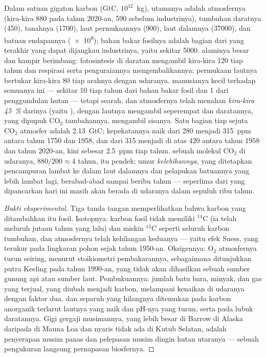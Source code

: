 \begin{proposition}\label{prop:b2:biogeochemical-cycles:carbon}
Dalam satuan gigaton karbon (\unit{GtC}, $10^{12}$~kg), 
utamanya adalah atmosfernya (kira-kira 880 pada tahun 2020-an, 590
sebelum industrinya), tumbuhan daratnya (450), tanahnya (1700), laut
permukaannya (900), laut dalamnya (\num{37000}), dan batuan endapannya
(\num{e8}); bahan bakar fosilnya adalah bagian dari yang terakhir yang
dapat dijangkau industrinya, yaitu sekitar \num{5000}.  alaminya
besar dan hampir berimbang: fotosintesis di daratan mengambil kira-kira
120 tiap tahun dan respirasi serta penguraiannya mengembalikannya;
permukaan lautnya bertukar kira-kira 80 tiap arahnya dengan udaranya.
 manusianya kecil terhadap semuanya ini --- sekitar 10 tiap tahun
dari bahan bakar fosil dan 1 dari penggundulan hutan --- tetapi searah,
dan atmosfernya telah menahan \emph{kira-kira \qty{45}{\%}} darinya
(yaitu \emph{}), dengan lautnya mengambil
seperempat dan daratannya, yang dipupuk $\mathrm{CO_2}$ tambahannya,
mengambil sisanya. Satu bagian tiap sejuta $\mathrm{CO_2}$ atmosfer adalah
\qty{2.13}{GtC}; kepekatannya naik dari 280 menjadi \num{315}~ppm
antara tahun 1750 dan 1958, dan dari 315 menjadi di atas \num{420}
antara tahun 1958 dan tahun 2020-an, kini sebesar \qty{2.5}{ppm} tiap
tahun.  sebuah molekul $\mathrm{CO_2}$ di udaranya, $880/200 \approx 4$ tahun, itu pendek; umur \emph{kelebihannya}, yang ditetapkan
pencampuran lambat ke dalam laut dalamnya dan pelapukan batuannya yang
lebih lambat lagi, berabad-abad sampai beribu tahun --- seperlima dari
yang dipancarkan hari ini masih akan berada di udaranya dalam sepuluh
ribu tahun.
\end{proposition}
\begin{proof}[Bukti eksperimental]
Tiga tanda tangan memperlihatkan bahwa karbon yang ditambahkan itu
fosil. Isotopnya: karbon fosil tidak memiliki $\mathrm{{}^{14}C}$ (ia
telah meluruh jutaan tahun yang lalu) dan miskin $\mathrm{{}^{13}C}$
seperti seluruh karbon tumbuhan, dan atmosfernya telah kehilangan
keduanya --- yaitu efek Suess, yang terukur pada lingkaran pohon sejak
tahun 1950-an. Oksigennya: $\mathrm{O_2}$ atmosfernya turun seiring,
menurut stoikiometri pembakarannya, sebagaimana ditunjukkan putra
Keeling pada tahun 1990-an, yang tidak akan dihasilkan sebuah sumber
gunung api atau sumber laut. Pembukuannya: jumlah batu bara, minyak,
dan gas yang terjual, yang diubah menjadi karbon, melampaui kenaikan di
udaranya dengan faktor dua, dan separuh yang hilangnya ditemukan pada
karbon anorganik terlarut lautnya yang naik dan pH-nya yang turun,
serta pada lubuk daratannya. Gigi gergaji musimannya, yang lebih besar
di Barrow di Alaska daripada di Mauna Loa dan nyaris tidak ada di Kutub
Selatan, adalah penyerapan musim panas dan pelepasan musim dingin hutan
utaranya --- sebuah pengukuran langsung pernapasan biosfernya.
\end{proof}

